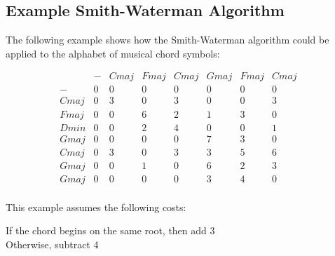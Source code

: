 \subsection{Example Smith-Waterman Algorithm}

The following example shows how the Smith-Waterman algorithm could be applied to the alphabet of musical chord symbols:

\[ \begin{array}{cccccccc} & - & Cmaj & Fmaj & Cmaj & Gmaj & Fmaj & Cmaj & \\ - & 0 & 0 & 0 & 0 & 0 & 0 & 0 & \\ Cmaj & 0 & 3 & 0 & 3 & 0 & 0 & 3 & \\ Fmaj & 0 & 0 & 6 & 2 & 1 & 3 & 0 & \\ Dmin & 0 & 0 & 2 & 4 & 0 & 0 & 1 & \\ Gmaj & 0 & 0 & 0 & 0 & 7 & 3 & 0 & \\ Cmaj & 0 & 3 & 0 & 3 & 3 & 5 & 6 & \\ Gmaj & 0 & 0 & 1 & 0 & 6 & 2 & 3 & \\ Gmaj & 0 & 0 & 0 & 0 & 3 & 4 & 0 & \\ \end{array} \]

This example assumes the following costs:

If the chord begins on the same root, then add 3 \\
Otherwise, subtract 4 \\